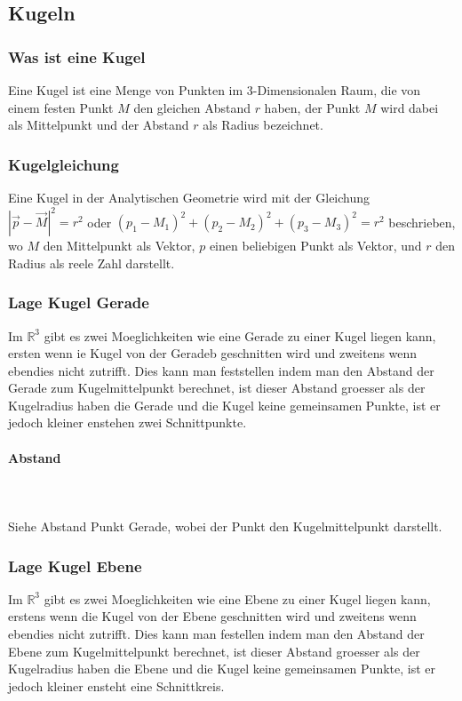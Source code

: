 \documentclass[a4paper]{article} %
\begin{document}
	\subsection{Kugeln}
	\subsubsection{Was ist eine Kugel}
	Eine Kugel ist eine Menge von Punkten im 3-Dimensionalen Raum, die von einem festen Punkt $M$ den gleichen Abstand $r$ haben,
	der Punkt $M$ wird dabei als Mittelpunkt und der Abstand $r$ als Radius bezeichnet.
	\subsubsection{Kugelgleichung}
	Eine Kugel in der Analytischen Geometrie wird mit der Gleichung\\ $|\vec{p}-\vec{M}|^2=r^2$ oder
	$(p_1-M_1)^2+(p_2-M_2)^2+(p_3-M_3)^2=r^2$ beschrieben, wo $M$ den Mittelpunkt als Vektor, $p$ einen beliebigen Punkt als Vektor, und $r$ den Radius als reele Zahl darstellt.
	\subsubsection{Lage Kugel Gerade}
	Im $\mathbb{R}^3$ gibt es zwei Moeglichkeiten wie eine Gerade zu einer Kugel liegen kann, ersten wenn ie Kugel von der Geradeb geschnitten wird und zweitens wenn ebendies nicht zutrifft. Dies kann man feststellen indem man den Abstand der Gerade zum Kugelmittelpunkt berechnet, ist dieser Abstand groesser als der Kugelradius haben die Gerade und die Kugel keine gemeinsamen Punkte, ist er jedoch kleiner enstehen zwei Schnittpunkte.
	\paragraph{Abstand}
	\hspace{0 cm} \\ \noindent \\
	Siehe Abstand Punkt Gerade, wobei der Punkt den Kugelmittelpunkt darstellt.
	\subsubsection{Lage Kugel Ebene}
	Im $\mathbb{R}^3$ gibt es zwei Moeglichkeiten wie eine Ebene zu einer Kugel liegen kann, erstens wenn die Kugel von der Ebene geschnitten wird und zweitens wenn ebendies nicht zutrifft. Dies kann man festellen indem man den Abstand der Ebene zum Kugelmittelpunkt berechnet, ist dieser Abstand groesser als der Kugelradius haben die Ebene und die Kugel keine gemeinsamen Punkte, ist er jedoch kleiner ensteht eine Schnittkreis.
\end{document}
